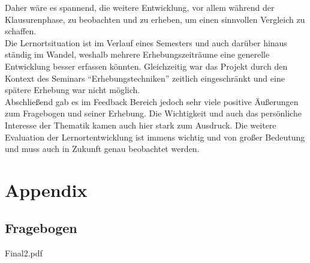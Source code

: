 \documentclass[11pt, a4paper]{article}
\begin{document}
Daher wäre es spannend, die weitere Entwicklung, vor allem während der Klausurenphase, zu beobachten und zu erheben, um einen sinnvollen Vergleich zu schaffen.\\
Die Lernortsituation ist im Verlauf eines Semesters und auch darüber hinaus ständig im Wandel, weshalb mehrere Erhebungszeiträume eine generelle Entwicklung besser erfassen könnten. Gleichzeitig war das Projekt durch den Kontext des Seminars “Erhebungstechniken” zeitlich eingeschränkt und eine spätere Erhebung war nicht möglich.\\
Abschließend gab es im Feedback Bereich jedoch sehr viele positive Äußerungen zum Fragebogen und seiner Erhebung. Die Wichtigkeit und auch das persönliche Interesse der Thematik kamen auch hier stark zum Ausdruck. Die weitere Evaluation der Lernortentwicklung ist immens wichtig und von großer Bedeutung und muss auch in Zukunft genau beobachtet werden.


\newpage
\section{Appendix}
\subsection{Fragebogen}

\begin{figure}[h]
	
\end{figure}
\pagestyle{plain}
\newpage
 {Final2.pdf}
\newpage
\end{document}

